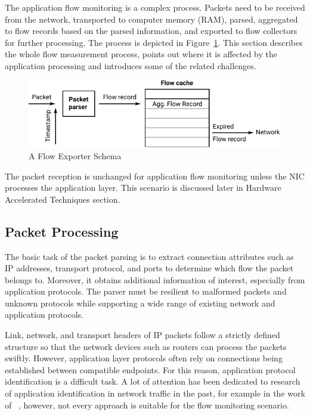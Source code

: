 The application flow monitoring is a complex process. Packets need to be received from the network, transported to computer memory (RAM), parsed, aggregated to flow records based on the parsed information, and exported to flow collectors for further processing. The process is depicted in Figure~\ref{fig:flow-exporter-schema}. This section describes the whole flow measurement process, points out where it is affected by the application processing and introduces some of the related challenges.

\begin{figure}[tb!]
  \begin{center}
    \includegraphics[width=\textwidth]{figures/flow-exporter-schema}
  \end{center}
  \caption{A Flow Exporter Schema}
  \label{fig:flow-exporter-schema}
\end{figure}


The packet reception is unchanged for application flow monitoring unless the NIC processes the application layer. This scenario is discussed later in Hardware Accelerated Techniques section.


\subsection{Packet Processing}


The basic task of the packet parsing is to extract connection attributes such as IP addresses, transport protocol, and ports to determine which flow the packet belongs to. Moreover, it obtains additional information of interest, especially from application protocols. The parser must be resilient to malformed packets and unknown protocols while supporting a wide range of existing network and application protocols.

Link, network, and transport headers of IP packets follow a strictly defined structure so that the network devices such as routers can process the packets swiftly. However, application layer protocols often rely on connections being established between compatible endpoints. For this reason, application protocol identification is a difficult task. A lot of attention has been dedicated to research of application identification in network traffic in the past, for example in the work of \citeauthor{Bujlow-2015-classification}~\cite{Bujlow-2015-classification}, however, not every approach is suitable for the flow monitoring scenario.


